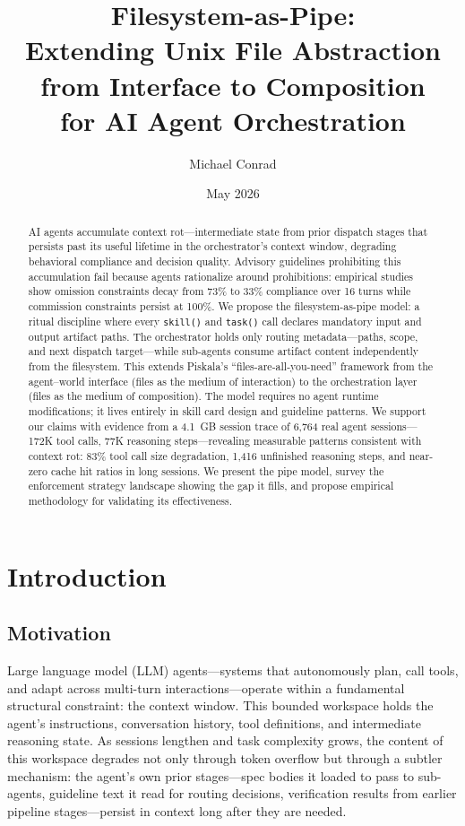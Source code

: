 \documentclass[11pt,a4paper]{article}
\title{
  \vspace{-1.5cm}
  \textbf{Filesystem-as-Pipe: \\
  Extending Unix File Abstraction from Interface to Composition \\
  for AI Agent Orchestration}
}
\author{Michael Conrad}
\date{May 2026}
\begin{document}
\maketitle
\thispagestyle{fancy}

\begin{abstract}
AI agents accumulate context rot---intermediate state from prior dispatch stages that persists past its useful lifetime in the orchestrator's context window, degrading behavioral compliance and decision quality. Advisory guidelines prohibiting this accumulation fail because agents rationalize around prohibitions: empirical studies show omission constraints decay from 73\% to 33\% compliance over 16 turns while commission constraints persist at 100\%. We propose the filesystem-as-pipe model: a ritual discipline where every \texttt{skill()} and \texttt{task()} call declares mandatory input and output artifact paths. The orchestrator holds only routing metadata---paths, scope, and next dispatch target---while sub-agents consume artifact content independently from the filesystem. This extends Piskala's ``files-are-all-you-need'' framework from the agent--world interface (files as the medium of interaction) to the orchestration layer (files as the medium of composition). The model requires no agent runtime modifications; it lives entirely in skill card design and guideline patterns. We support our claims with evidence from a 4.1~GB session trace of 6,764 real agent sessions---172K tool calls, 77K reasoning steps---revealing measurable patterns consistent with context rot: 83\% tool call size degradation, 1,416 unfinished reasoning steps, and near-zero cache hit ratios in long sessions. We present the pipe model, survey the enforcement strategy landscape showing the gap it fills, and propose empirical methodology for validating its effectiveness.
\end{abstract}

\section{Introduction}
\label{sec:introduction}

\subsection{Motivation}
Large language model (LLM) agents---systems that autonomously plan, call tools, and adapt across multi-turn interactions---operate within a fundamental structural constraint: the context window. This bounded workspace holds the agent's instructions, conversation history, tool definitions, and intermediate reasoning state. As sessions lengthen and task complexity grows, the content of this workspace degrades not only through token overflow but through a subtler mechanism: the agent's own prior stages---spec bodies it loaded to pass to sub-agents, guideline text it read for routing decisions, verification results from earlier pipeline stages---persist in context long after they are needed.
\end{document}
